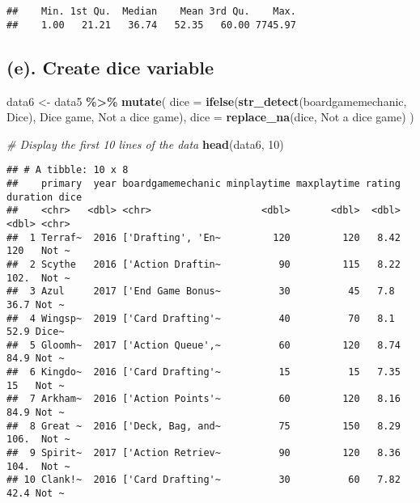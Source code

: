 \documentclass[
]{article}
\newenvironment{Shaded}{\begin{snugshade}}{\end{snugshade}}
\newcommand{\AttributeTok}[1]{\textcolor[rgb]{0.13,0.29,0.53}{#1}}
\newcommand{\CommentTok}[1]{\textcolor[rgb]{0.56,0.35,0.01}{\textit{#1}}}
\newcommand{\DecValTok}[1]{\textcolor[rgb]{0.00,0.00,0.81}{#1}}
\newcommand{\FunctionTok}[1]{\textcolor[rgb]{0.13,0.29,0.53}{\textbf{#1}}}
\newcommand{\NormalTok}[1]{#1}
\newcommand{\OtherTok}[1]{\textcolor[rgb]{0.56,0.35,0.01}{#1}}
\newcommand{\SpecialCharTok}[1]{\textcolor[rgb]{0.81,0.36,0.00}{\textbf{#1}}}
\newcommand{\StringTok}[1]{\textcolor[rgb]{0.31,0.60,0.02}{#1}}
\begin{document}
\begin{Shaded}
\end{Shaded}

\begin{verbatim}
##    Min. 1st Qu.  Median    Mean 3rd Qu.    Max. 
##    1.00   21.21   36.74   52.35   60.00 7745.97
\end{verbatim}

\hypertarget{e.-create-dice-variable}{%
\subsection{\texorpdfstring{(e). Create \textbf{dice} variable}{(e). Create dice variable}}\label{e.-create-dice-variable}}

\begin{Shaded}
\begin{Highlighting}[]
\NormalTok{data6 }\OtherTok{\textless{}{-}}\NormalTok{ data5 }\SpecialCharTok{\%\textgreater{}\%}
  \FunctionTok{mutate}\NormalTok{(}
    \AttributeTok{dice =} \FunctionTok{ifelse}\NormalTok{(}\FunctionTok{str\_detect}\NormalTok{(boardgamemechanic, }\StringTok{\textquotesingle{}Dice\textquotesingle{}}\NormalTok{), }\StringTok{\textquotesingle{}Dice game\textquotesingle{}}\NormalTok{, }\StringTok{\textquotesingle{}Not a dice game\textquotesingle{}}\NormalTok{),}
    \AttributeTok{dice =} \FunctionTok{replace\_na}\NormalTok{(dice, }\StringTok{\textquotesingle{}Not a dice game\textquotesingle{}}\NormalTok{)}
\NormalTok{  )}

\CommentTok{\# Display the first 10 lines of the data}
\FunctionTok{head}\NormalTok{(data6, }\DecValTok{10}\NormalTok{)}
\end{Highlighting}
\end{Shaded}

\begin{verbatim}
## # A tibble: 10 x 8
##    primary  year boardgamemechanic minplaytime maxplaytime rating duration dice 
##    <chr>   <dbl> <chr>                   <dbl>       <dbl>  <dbl>    <dbl> <chr>
##  1 Terraf~  2016 ['Drafting', 'En~         120         120   8.42    120   Not ~
##  2 Scythe   2016 ['Action Draftin~          90         115   8.22    102.  Not ~
##  3 Azul     2017 ['End Game Bonus~          30          45   7.8      36.7 Not ~
##  4 Wingsp~  2019 ['Card Drafting'~          40          70   8.1      52.9 Dice~
##  5 Gloomh~  2017 ['Action Queue',~          60         120   8.74     84.9 Not ~
##  6 Kingdo~  2016 ['Card Drafting'~          15          15   7.35     15   Not ~
##  7 Arkham~  2016 ['Action Points'~          60         120   8.16     84.9 Not ~
##  8 Great ~  2016 ['Deck, Bag, and~          75         150   8.29    106.  Not ~
##  9 Spirit~  2017 ['Action Retriev~          90         120   8.36    104.  Not ~
## 10 Clank!~  2016 ['Card Drafting'~          30          60   7.82     42.4 Not ~
\end{verbatim}
\end{document}
